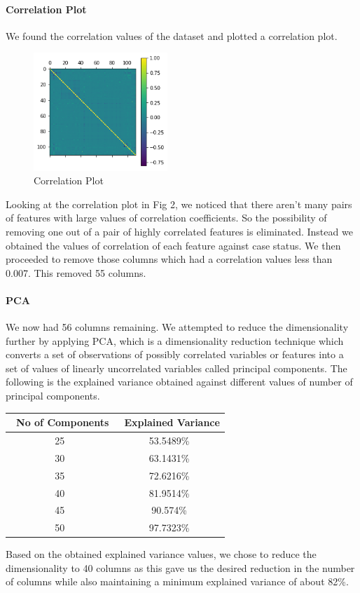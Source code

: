 \documentclass[conference]{IEEEtran}
\begin{document}
\paragraph{\textbf{Correlation Plot}}
We found the correlation values of the dataset and plotted a correlation plot.
\begin{center}
\begin{figure}[h]
\centering
\includegraphics[width=0.45\textwidth]{correlation.png}
\caption{Correlation Plot}
\label{fig:mesh1}
\end{figure}
\end{center}
Looking at the correlation plot in Fig 2, we noticed that there aren't many pairs of features with large values of correlation coefficients. So the possibility of removing one out of a pair of highly correlated features is eliminated. 
Instead we obtained the values of correlation of each feature against case status. We then proceeded to remove those columns which had a correlation values less than 0.007. This removed 55 columns.

\paragraph{\textbf{PCA}}
We now had 56 columns remaining. We attempted to reduce the dimensionality further by applying PCA, which is a dimensionality reduction technique which converts a set of observations of possibly correlated variables or features into a set of values of linearly uncorrelated variables called principal components.
The following is the explained variance obtained against different values of number of principal components.
\begin{center}
 \label{tab:title}
  \begin{tabularx}{0.367\textwidth}{| c | c |}
  \hline
  \centering
     \ No of Components & \ Explained Variance\\ \hline
	25	& 53.5489\% \\
    30	& 63.1431\% \\
    35	& 72.6216\% \\
    40	& 81.9514\% \\
    45	& 90.574\%  \\
    50	& 97.7323\% \\
    \hline
  \end{tabularx}
  \end{center}
Based on the obtained explained variance values, we chose to reduce the dimensionality to 40 columns as this gave us the desired reduction in the number of columns while also maintaining a minimum explained variance of about 82\%.
\end{document}
